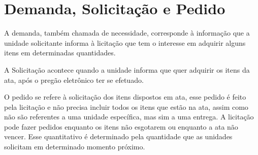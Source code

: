 \documentclass[ ]{article}
\begin{document}
\section{Demanda, Solicitação e Pedido}
	A demanda, também chamada de necessidade, corresponde à informação que a unidade solicitante informa à licitação que tem o interesse em adquirir alguns itens em determinadas quantidades.
	
	A Solicitação acontece quando a unidade informa que quer adquirir os itens da ata, após o pregão eletrônico ter se efetuado.
	
	O pedido se refere à solicitação dos itens dispostos em ata, esse pedido é feito pela licitação e não precisa incluir todos os itens que estão na ata, assim como não são referentes a uma unidade específica, mas sim a uma entrega. A licitação pode fazer pedidos enquanto os itens não esgotarem ou enquanto a ata não vencer. Esse quantitativo é determinado pela quantidade que as unidades solicitam em determinado momento próximo.
\end{document}
